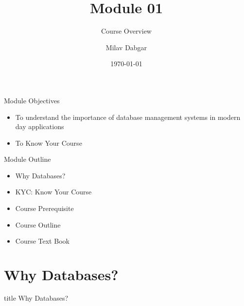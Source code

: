 \documentclass[aspectratio=169, xcolor=dvipsnames]{beamer}
\title{Module 01}
\subtitle{Course Overview}
\author{Milav Dabgar}
\institute{www.milav.in}
\date{\today}
\begin{document}
\begin{frame}
    \titlepage
\end{frame}

\begin{frame}{Module Objectives}
    \begin{itemize}[<+->]
        \item To understand the importance of database management systems in modern day applications
        \item To Know Your Course
    \end{itemize}
\end{frame}

\begin{frame}{Module Outline}
    \begin{itemize}[<+->]
        \item Why Databases?
        \item KYC: Know Your Course
        \item Course Prerequisite
        \item Course Outline
        \item Course Text Book
    \end{itemize}
\end{frame}

\section{Why Databases?}

\begin{frame}
  \vfill
  \centering
  \begin{beamercolorbox}[sep=8pt,center,shadow=true,rounded=true]{title}
    Why Databases?\par%
  \end{beamercolorbox}
  \vfill
\end{frame}
\end{document}

